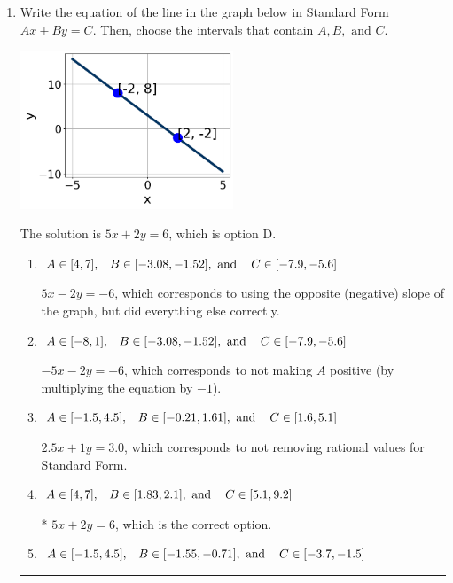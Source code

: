 \documentclass{extbook}[14pt]
\newcommand{\litem}[1]{\item #1

\rule{\textwidth}{0.4pt}}
\begin{document}
\begin{enumerate}\litem{
Write the equation of the line in the graph below in Standard Form $Ax+By=C$. Then, choose the intervals that contain $A, B, \text{ and } C$.

\begin{center}
    \includegraphics[width=0.5\textwidth]{../Figures/linearGraphToStandardB.png}
\end{center}


The solution is \( 5x + 2y = 6 \), which is option D.\begin{enumerate}[label=\Alph*.]
\item \( A \in [4, 7], \hspace{3mm} B \in [-3.08, -1.52], \text{ and } \hspace{3mm} C \in [-7.9, -5.6] \)

 $5x - 2y = -6$, which corresponds to using the opposite (negative) slope of the graph, but did everything else correctly.
\item \( A \in [-8, 1], \hspace{3mm} B \in [-3.08, -1.52], \text{ and } \hspace{3mm} C \in [-7.9, -5.6] \)

 $-5x - 2y = -6$, which corresponds to not making $A$ positive (by multiplying the equation by $-1$).
\item \( A \in [-1.5, 4.5], \hspace{3mm} B \in [-0.21, 1.61], \text{ and } \hspace{3mm} C \in [1.6, 5.1] \)

 $2.5x + 1y = 3.0$, which corresponds to not removing rational values for Standard Form.
\item \( A \in [4, 7], \hspace{3mm} B \in [1.83, 2.1], \text{ and } \hspace{3mm} C \in [5.1, 9.2] \)

* $5x + 2y = 6$, which is the correct option.
\item \( A \in [-1.5, 4.5], \hspace{3mm} B \in [-1.55, -0.71], \text{ and } \hspace{3mm} C \in [-3.7, -1.5] \)


\end{enumerate}}
\end{enumerate}
\end{document}
